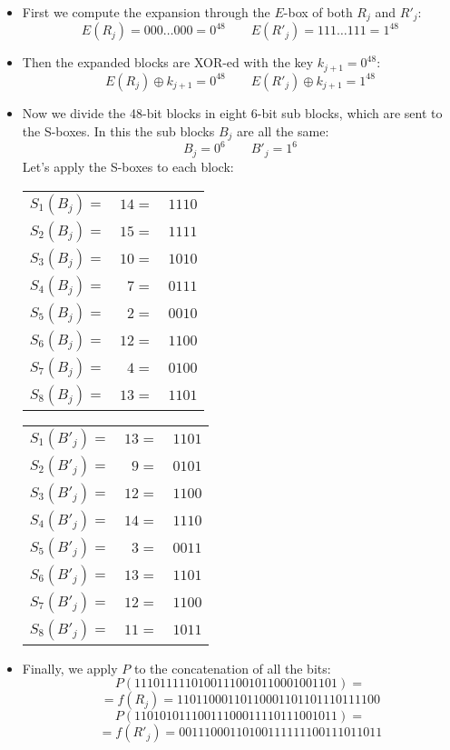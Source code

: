 \documentclass{article}
\begin{document}
  \begin{itemize}
	\item First we compute the expansion through the $E$-box of both
	  $R_{j}$ and $R'_{j}$:
	  $$
		E(R_{j}) = 000\dots000 = 0^{48} 
		\qquad 
		E(R'_{j}) = 111\dots111 = 1^{48}
	  $$

	\item Then the expanded blocks are XOR-ed with the key $k_{j+1} =
	  0^{48}$:
	  $$
		E(R_{j})\oplus k_{j+1} = 0^{48}
		\qquad
		E(R'_{j})\oplus k_{j+1} = 1^{48}
	  $$

	\item Now we divide the 48-bit blocks in eight 6-bit sub blocks,
	  which are sent to the S-boxes. In this the sub blocks $B_{j}$ are all
	  the same:
	  $$
		B_{j} = 0^{6}
		\qquad
		B'_{j} = 1^{6}
	  $$
	  Let's apply the S-boxes to each block:
	  \begin{center}
		\begin{tabular}{crr}
		  $S_{1}(B_{j}) = $ & $14 = $ & $1110$ \\
		  $S_{2}(B_{j}) = $ & $15 = $ & $1111$ \\
		  $S_{3}(B_{j}) = $ & $10 = $ & $1010$ \\
		  $S_{4}(B_{j}) = $ & $7  = $ & $0111$ \\
		  $S_{5}(B_{j}) = $ & $2  = $ & $0010$ \\
		  $S_{6}(B_{j}) = $ & $12 = $ & $1100$ \\
		  $S_{7}(B_{j}) = $ & $4  = $ & $0100$ \\
		  $S_{8}(B_{j}) = $ & $13 = $ & $1101$ \\
		\end{tabular}
		\qquad
		\begin{tabular}{crr}
		  $S_{1}(B'_{j}) = $ & $13 = $ & $1101$ \\
		  $S_{2}(B'_{j}) = $ & $9  = $ & $0101$ \\
		  $S_{3}(B'_{j}) = $ & $12 = $ & $1100$ \\
		  $S_{4}(B'_{j}) = $ & $14 = $ & $1110$ \\
		  $S_{5}(B'_{j}) = $ & $3  = $ & $0011$ \\
		  $S_{6}(B'_{j}) = $ & $13 = $ & $1101$ \\
		  $S_{7}(B'_{j}) = $ & $12 = $ & $1100$ \\
		  $S_{8}(B'_{j}) = $ & $11 = $ & $1011$ \\
		\end{tabular}
	  \end{center}

	\item Finally, we apply $P$ to the concatenation of all the bits:
	  $$
		P(11101111101001110010110001001101) = 
	  $$
	  $$
		= f(R_{j}) =  11011000110110001101101110111100
	  $$
	  $$
		P(11010101110011100011110111001011) =
		$$
	  $$
		= f(R'_{j}) = 00111000110100111111100111011011
	  $$

  \end{itemize}
\end{document}
